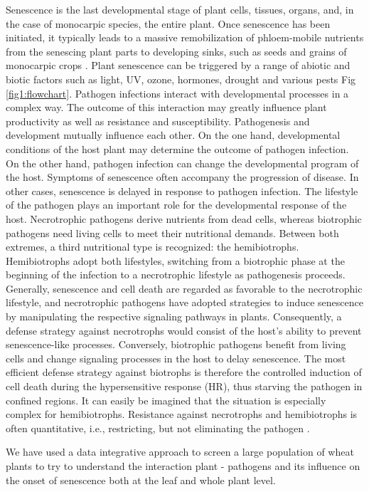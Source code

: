 \documentclass{frontiersSCNS} %
\begin{document}
Senescence is the last developmental stage of plant cells, tissues, organs, and, in the case of monocarpic species, the entire plant. Once senescence has been initiated, it typically leads to a massive remobilization of phloem-mobile nutrients from the senescing plant parts to developing sinks, such as seeds and grains of monocarpic crops \cite{Distelfeld27012014}. Plant senescence can be triggered by a range of abiotic and biotic factors such as light, UV, ozone, hormones, drought and various pests \cite{PLB:PLB114} Fig \ref{fig1:flowchart}. Pathogen infections interact with developmental processes in a complex way. The outcome of this interaction may greatly influence plant productivity as well as resistance and susceptibility. Pathogenesis and development mutually influence each other. On the one hand, developmental conditions of the host plant may determine the outcome of pathogen infection. On the other hand, pathogen infection can change the developmental program of the host. Symptoms of senescence often accompany the progression of disease. In other cases, senescence is delayed in response to pathogen infection. The lifestyle of the pathogen plays an important role for the developmental response of the host. Necrotrophic pathogens derive nutrients from dead cells, whereas biotrophic pathogens need living cells to meet their nutritional demands. Between both extremes, a third nutritional type is recognized: the hemibiotrophs. Hemibiotrophs adopt both lifestyles, switching from a biotrophic phase at the beginning of the infection to a necrotrophic lifestyle as pathogenesis proceeds. Generally, senescence and cell death are regarded as favorable to the necrotrophic lifestyle, and necrotrophic pathogens have adopted strategies to induce senescence by manipulating the respective signaling pathways in plants. Consequently, a defense strategy against necrotrophs would consist of the host’s ability to prevent senescence-like processes. Conversely, biotrophic pathogens benefit from living cells and change signaling processes in the host to delay senescence. The most efficient defense strategy against biotrophs is therefore the controlled induction of cell death during the hypersensitive response (HR), thus starving the pathogen in confined regions. It can easily be imagined that the situation is especially complex for hemibiotrophs. Resistance against necrotrophs and hemibiotrophs is often quantitative, i.e., restricting, but not eliminating the pathogen \cite{plants4030449}.

We have used a data integrative approach to screen a large population of wheat plants to try to understand the interaction plant - pathogens and its influence on the onset of senescence both at the leaf and whole plant level.
\end{document}
